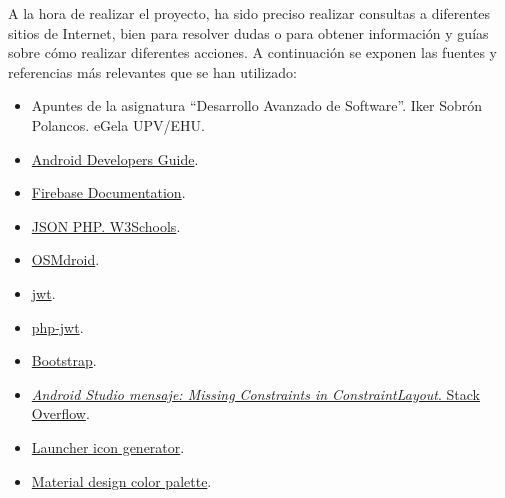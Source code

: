 A la hora de realizar el proyecto, ha sido preciso realizar consultas a diferentes sitios de Internet, bien para resolver dudas o para obtener información y guías sobre cómo realizar diferentes acciones. A continuación se exponen las fuentes y referencias más relevantes que se han utilizado:

\begin{itemize}
    \item Apuntes de la asignatura “Desarrollo Avanzado de Software”. Iker Sobrón Polancos. eGela UPV/EHU.
    \item \href{https://developer.android.com/}{Android Developers Guide}.
    \item \href{https://firebase.google.com/docs/cloud-messaging/auth-server}{Firebase Documentation}.
    \item \href{https://www.w3schools.com/js/js_json_php.asp}{JSON PHP. W3Schools}.
    \item \href{https://github.com/osmdroid/osmdroid}{OSMdroid}.
    \item \href{https://github.com/luciferous/jwt}{jwt}.
    \item \href{https://github.com/firebase/php-jwt}{php-jwt}.
    \item \href{https://getbootstrap.com}{Bootstrap}.
    \item \href{https://stackoverflow.com/questions/16616458/how-to-use-resource-arrays-using-xml-in-android}{\textit{Android Studio mensaje: Missing Constraints in ConstraintLayout}. Stack Overflow}.
    \item \href{https://romannurik.github.io/AndroidAssetStudio/icons-launcher.html}{Launcher icon generator}.
    \item \href{https://materialui.co/colors}{Material design color palette}.
\end{itemize}